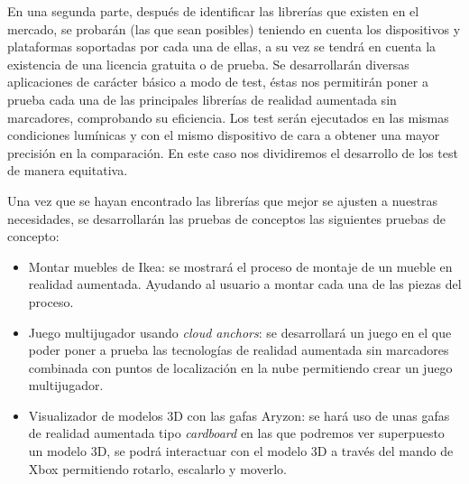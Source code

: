En una segunda parte, después de identificar las librerías que existen en el mercado, se probarán (las que sean posibles) teniendo en cuenta los dispositivos y plataformas soportadas por cada una de ellas, a su vez se tendrá en cuenta la existencia de una licencia gratuita o de prueba. Se desarrollarán diversas aplicaciones de carácter básico a modo de test, éstas nos permitirán poner a prueba cada una de las principales librerías de realidad aumentada sin marcadores, comprobando su eficiencia. Los test serán ejecutados en las mismas condiciones lumínicas y con el mismo dispositivo de cara a obtener una mayor precisión en la comparación. En este caso nos dividiremos el desarrollo de los test de manera equitativa.\vspace{\baselineskip}

Una vez que se hayan encontrado las librerías que mejor se ajusten a nuestras necesidades, se desarrollarán las pruebas de conceptos las siguientes pruebas de concepto:
\begin{itemize}
\item Montar muebles de Ikea: se mostrará el proceso de montaje de un mueble en realidad aumentada. Ayudando al usuario a montar cada una de las piezas del proceso.
\item Juego multijugador usando \textit{cloud anchors}: se desarrollará un juego en el que poder poner a prueba las tecnologías de realidad aumentada sin marcadores combinada con puntos de localización en la nube permitiendo crear un juego multijugador.
\item Visualizador de modelos 3D con las gafas Aryzon: se hará uso de unas gafas de realidad aumentada tipo \textit{cardboard} en las que podremos ver superpuesto un modelo 3D, se podrá interactuar con el modelo 3D a través del mando de Xbox permitiendo rotarlo, escalarlo y moverlo.
\end{itemize}






















